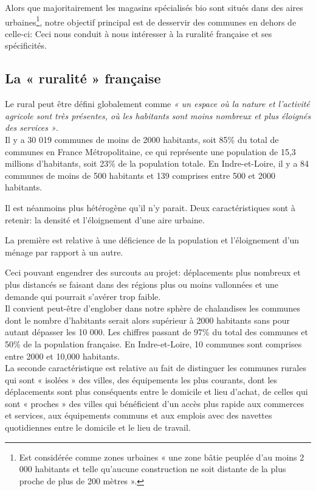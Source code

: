 \documentclass[12pt,a4paper]{report}
\begin{document}
	
	Alors que majoritairement les magasins spécialisés bio sont situés dans des aires urbaines\footnote{Est considérée comme zones urbaines « une zone bâtie peuplée d'au moins 2 000 habitants et telle qu'aucune construction ne soit distante de la plus proche de plus de 200 mètres ».}, notre objectif principal est de desservir des communes en dehors de celle-ci: Ceci nous conduit à nous intéresser à la ruralité française et ses spécificités.
	
	\subsection{La « ruralité » française }
	
	Le rural peut être défini globalement comme \textit{« un espace où la nature et l’activité agricole sont très présentes, où les habitants sont moins nombreux et plus éloignés des services »}.\\
	
	
	Il y a 30 019 communes de moins de 2000 habitants, soit 85\% du total de communes en France Métropolitaine, ce qui représente une population de 15,3 millions d’habitants, soit 23\% de la population totale. En Indre-et-Loire, il y a 84 communes de moins de 500 habitants et 139 comprises entre 500 et 2000 habitants.
	
	Il est néanmoins plus hétérogène qu’il n’y parait. Deux caractéristiques sont à retenir: la densité et l’éloignement d’une aire urbaine. 
	
	La première est relative à une déficience de la population et l’éloignement d’un ménage par rapport à un autre. 
	
	 Ceci pouvant engendrer des surcouts au projet: déplacements plus nombreux et plus distancés se faisant dans des régions plus ou moins vallonnées et une demande qui pourrait s’avérer trop faible.  \\
	 
	 Il convient peut-être d’englober dans notre sphère de chalandises les communes dont le nombre d’habitants serait alors supérieur à 2000 habitants sans pour autant dépasser les 10 000. Les chiffres passant de 97\% du total des communes et 50\% de la population française. En Indre-et-Loire, 10 communes sont comprises entre 2000 et 10,000 habitants.   \\
	 
	La seconde caractéristique est relative au fait de distinguer les communes rurales qui sont « isolées » des villes, des équipements les plus courants, dont les déplacements sont plus conséquents entre le domicile et lieu d’achat, de celles qui sont « proches » des villes qui bénéficient d’un accès plus rapide aux commerces et services, aux équipements communs et aux emplois avec des navettes quotidiennes entre le domicile et le lieu de travail. \\
	
\end{document}
